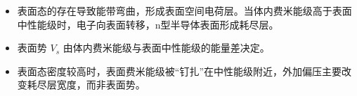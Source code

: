 \begin{insightbox}[物理图像]
\begin{itemize}
    \item 表面态的存在导致能带弯曲，形成表面空间电荷层。当体内费米能级高于表面中性能级时，电子向表面转移，n型半导体表面形成耗尽层。
    \item 表面势 $V_s$ 由体内费米能级与表面中性能级的能量差决定。
    \item 表面态密度较高时，表面费米能级被``钉扎''在中性能级附近，外加偏压主要改变耗尽层宽度，而非表面势。
\end{itemize}
\end{insightbox}
